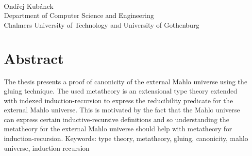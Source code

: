\oneLineTitle\\
Ond\v{r}ej Kubánek\\
Department of Computer Science and Engineering\\
Chalmers University of Technology and University of Gothenburg

\thispagestyle{plain}			%
\section*{Abstract}

The thesis presents a proof of canonicity of the external Mahlo universe using the gluing technique. The used metatheory is an extensional type theory extended with indexed induction-recursion to express the reducibility predicate for the external Mahlo universe. This is motivated by the fact that the Mahlo universe can express certain inductive-recursive definitions and so understanding the metatheory for the external Mahlo universe should help with metatheory for induction-recursion.
\vfill
Keywords: type theory, metatheory, gluing, canonicity, mahlo universe, induction-recursion

\newpage				%
\thispagestyle{empty}
\mbox{}

